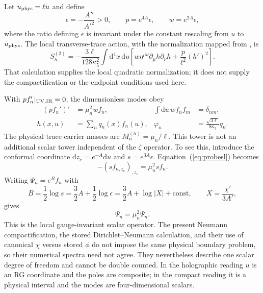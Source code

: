 \documentclass[10pt]{article}
\newcommand{\dd}{\mathrm{d}}
\begin{document}
Let $u_{\rm phys}=\ell u$ and define
\begin{equation}
 \epsilon=-\frac{A''}{A'^2}>0,\qquad
 p=e^{4A}\epsilon,\qquad w=e^{2A}\epsilon,
 \label{eq:carrierweights}
\end{equation}
where the ratio defining $\epsilon$ is invariant under the constant rescaling
from $u$ to $u_{\rm phys}$.  The local transverse-trace action, with the
normalization mapped from \citet{Arutyunov2000}, is
\begin{equation}
 S_h^{(2)}=-\frac{3\ell}{128\kappa_5^2}\int\dd^4x\,\dd u
 \left[w\eta^{\mu\nu}\partial_\mu h\partial_\nu h
 +\frac{p}{\ell^2}(h')^2\right].
 \label{eq:traceaction}
\end{equation}
That calculation supplies the local quadratic normalization; it does not
supply the compactification or the endpoint conditions used here.

With $p f_n'|_{\rm UV,IR}=0$, the dimensionless modes obey
\begin{align}
 -(p f_n')'&=\mu_n^2 w f_n, &
 \int\dd u\,w f_nf_m&=\delta_{nm},\label{eq:probesl}\\
 h(x,u)&=\sum_n q_n(x)f_n(u), &
 \varphi_n&=\frac{\sqrt{3\ell}}{8\kappa_5}q_n .
 \label{eq:probecanonical}
\end{align}
The physical trace-carrier masses are $M_n^{(h)}=\mu_n/\ell$.  This tower is
not an additional scalar tower independent of the $\zeta$ operator.  To see
this, introduce the conformal coordinate $\dd z_c=e^{-A}\dd u$ and
$s=e^{3A}\epsilon$.  Equation~(\ref{eq:probesl}) becomes
\begin{equation}
 -(s f_{n,z_c})_{,z_c}=\mu_n^2s f_n.
\end{equation}
Writing $\Psi_n=e^Bf_n$ with
\begin{equation}
 B=\frac12\log s=\frac32A+\frac12\log\epsilon
  =\frac32A+\log|X|+\mathrm{const},
 \qquad X=\frac{\chi'}{3A'},
\end{equation}
gives
\begin{equation}
 [-\partial_{z_c}^2+B'^2+B'']\Psi_n=\mu_n^2\Psi_n.
 \label{eq:liouvilleequivalence}
\end{equation}
This is the local gauge-invariant scalar operator.  The present Neumann
compactification, the stored Dirichlet--Neumann calculation, and their use of
canonical $\chi$ versus stored $\phi$ do not impose the same physical boundary
problem, so their numerical spectra need not agree.  They nevertheless describe
one scalar degree of freedom and cannot be double counted.  In the holographic
reading $u$ is an RG coordinate and the poles are composite; in the compact
reading it is a physical interval and the modes are four-dimensional scalars.
\end{document}
